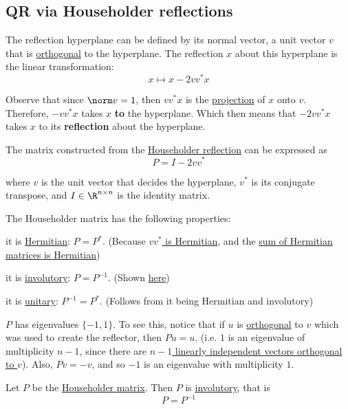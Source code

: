 \subsection{QR via Householder reflections}\label{e4faa2d}

\label{d7e9a69}

The reflection hyperplane can be defined by its normal vector, a unit vector
$v$ that is \href{d9735e5}{orthogonal} to the hyperplane. The reflection $x$
about this hyperplane is the linear transformation:
$$
  x\mapsto x-2vv^*x
$$

Observe that since $\norm v=1$, then $vv^*x$ is the \href{fc332ef}{projection}
of $x$ onto $v$. Therefore, $-vv^*x$ takes $x$ \textbf{to} the hyperplane.
Which then means that $-2vv^*x$ takes $x$ to its \textbf{reflection} about the
hyperplane.

\label{ae0f3b4}

The matrix constructed from the \href{d7e9a69}{Householder reflection} can be
expressed as
$$
  P=I-2vv^*
$$

where $v$ is the unit vector that decides the hyperplane, $v^*$ is its
conjugate transpose, and $I\in\R^{n\times n}$ is the identity matrix.

The Householder matrix has the following properties:
\begin{enumerati}
  \item it is \href{a633178}{Hermitian}: $P=P^*$. (Because
        \href{dd38b0c}{$vv^*$ is Hermitian}, and the \href{a2ea95a}{sum of
        Hermitian matrices is Hermitian})
  \item it is \href{bb02509}{involutory}: $P=P^{-1}$. (Shown
        \href{d6c51f2}{here})
  \item it is \href{a32560c}{unitary}: $P^{-1}=P^*$. (Follows from it being
        Hermitian and involutory)
  \item $P$ has eigenvalues $\{-1,1\}$. To see this, notice that if $u$ is
  \href{d9735e5}{orthogonal} to $v$ which was used to create the reflector,
  then $Pu=u$. (i.e. $1$ is an eigenvalue of multiplicity $n-1$, since there
  are \href{a0fa485}{$n-1$ linearly independent vectors orthogonal to $v$}).
  Also, $Pv=-v$, and so $-1$ is an eigenvalue with multiplicity $1$.
\end{enumerati}

\label{d6c51f2}

Let $P$ be the \href{ae0f3b4}{Householder matrix}. Then $P$ is
\href{bb02509}{involutory}, that is
$$
  P=P^{-1}
$$


